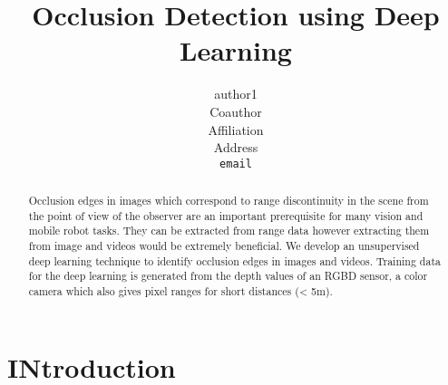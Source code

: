 \documentclass{article} %
\title{Occlusion Detection using Deep Learning}
\author{
author1 \\
\AND
Coauthor \\
Affiliation \\
Address \\
\texttt{email}
}
\begin{document}
\maketitle

\begin{abstract}
Occlusion edges in images which correspond to range discontinuity in the scene from the point of view of the observer are an important prerequisite for many vision and mobile robot tasks. They can be extracted from range data however extracting them from image and videos would be extremely beneficial. We develop an unsupervised deep learning technique to identify occlusion edges in images and videos. Training data for the deep learning is generated from the depth values of an RGBD sensor, a color camera which also gives pixel ranges for short distances (< 5m).
\end{abstract}

\section{INtroduction}

%
%
%
\end{document}
